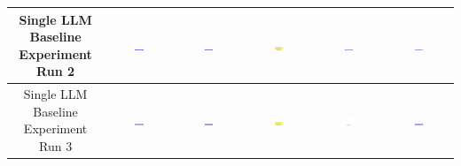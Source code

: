 \begin{table}[H]
\begin{tabular}{|c|c|c|c|c|c|}
    \hline
    Single LLM Baseline Experiment Run 2 & \includegraphics[width=0.15\textwidth]{./run_2/png/gpt-4o_results/ViaConnection.png} & \includegraphics[width=0.15\textwidth]{./run_2/png/claude-3-5-sonnet-20240620_results/ViaConnection.png} & \includegraphics[width=0.15\textwidth]{./run_2/png/watsonx_meta-llama_llama-3-1-70b-instruct_results/ViaConnection.png} & \includegraphics[width=0.15\textwidth]{./run_2/png/watsonx_meta-llama_llama-3-405b-instruct_results/ViaConnection.png} & \includegraphics[width=0.15\textwidth]{./run_2/png/o1-preview_results/ViaConnection.png} \\
    \hline
    Single LLM Baseline Experiment Run 3 & \includegraphics[width=0.15\textwidth]{./run_3/png/gpt-4o_results/ViaConnection.png} & \includegraphics[width=0.15\textwidth]{./run_3/png/claude-3-5-sonnet-20240620_results/ViaConnection.png} & \includegraphics[width=0.15\textwidth]{./run_3/png/watsonx_meta-llama_llama-3-1-70b-instruct_results/ViaConnection.png} & \includegraphics[width=0.15\textwidth]{./run_3/png/watsonx_meta-llama_llama-3-405b-instruct_results/ViaConnection.png} & \includegraphics[width=0.15\textwidth]{./run_3/png/o1-preview_results/ViaConnection.png} \\

\end{tabular}
\end{table}

